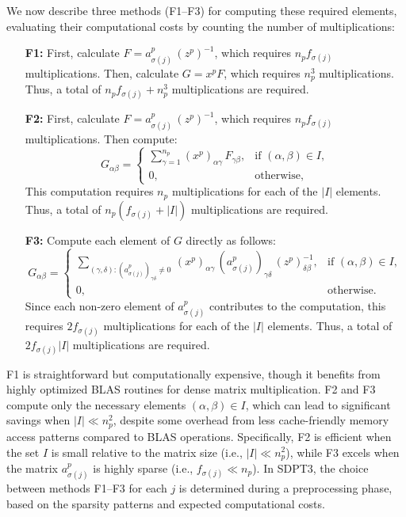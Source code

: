 We now describe three methods (F1--F3) for computing these required elements, evaluating their computational costs by counting the number of multiplications:
\begin{enumerate}
\item[\textbf{F1:}] First, calculate $F=a^p_{\sigma(j)}\,(z^p)^{-1}$, which requires $n_p f_{\sigma(j)}$ multiplications.
           Then, calculate $G=x^p F$, which requires $n_p^3$ multiplications.
           Thus, a total of $n_p f_{\sigma(j)} + n_p^3$ multiplications are required.
\item[\textbf{F2:}] First, calculate $F=a^p_{\sigma(j)}\,(z^p)^{-1}$, which requires $n_p f_{\sigma(j)}$ multiplications. Then compute:
  \[
    G_{\alpha\beta}=
    \begin{cases}
     \sum_{\gamma=1}^{n_p} (x^p)_{\alpha\gamma} \, F_{\gamma\beta}, & \text{if } (\alpha,\beta)\in I,\\
     0, & \text{otherwise},
    \end{cases}
  \]
  This computation requires $n_p$ multiplications for each of the $|I|$ elements.
  Thus, a total of $n_p (f_{\sigma(j)} + |I|)$ multiplications are required.
\item[\textbf{F3:}] Compute each element of $G$ directly as follows:
  \[
    G_{\alpha\beta}=
    \begin{cases}
      \sum_{(\gamma,\delta): (a^p_{\sigma(j)})_{\gamma\delta} \neq 0}\,
        (x^p)_{\alpha\gamma} \, (a^p_{\sigma(j)})_{\gamma\delta} \, (z^p)^{-1}_{\delta\beta},
       & \text{if } (\alpha,\beta) \in I,\\
      0, & \text{otherwise}.
    \end{cases}
  \]
  Since each non-zero element of $a^p_{\sigma(j)}$ contributes to the computation, this requires $2f_{\sigma(j)}$ multiplications for each of the $|I|$ elements.
  Thus, a total of $2f_{\sigma(j)}|I|$ multiplications are required.
\end{enumerate}
F1 is straightforward but computationally expensive, though it benefits from highly optimized BLAS routines for dense matrix multiplication.
F2 and F3 compute only the necessary elements $(\alpha,\beta) \in I$, which can lead to significant savings when $|I| \ll n_p^2$, despite some overhead from less cache-friendly memory access patterns compared to BLAS operations.
Specifically, F2 is efficient when the set $I$ is small relative to the matrix size (i.e., $|I| \ll n_p^2$), while F3 excels when the matrix $a^p_{\sigma(j)}$ is highly sparse (i.e., $f_{\sigma(j)} \ll n_p$).
In SDPT3, the choice between methods F1--F3 for each $j$ is determined during a preprocessing phase, based on the sparsity patterns and expected computational costs.

